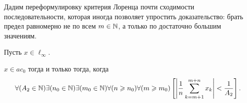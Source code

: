Дадим переформулировку критерия Лоренца
\cite{lorentz1948contribution,bennett1974consistency}
почти сходимости последовательности,
которая иногда позволяет упростить доказательство:
брать предел равномерно не по всем $m\in \mathbb{N}$,
а только по достаточно большим значениям.


\begin{lemma}
	\label{thm:Lorentz_mod}
	Пусть $x\in\ell_\infty$.

	$x\in ac_0$ тогда и только тогда, когда
	\begin{equation}\label{crit_pos_ac0}
		\forall(A_2\in\mathbb{N})
		\exists(n_0\in\mathbb{N})
		\exists(m_0\in\mathbb{N})
		\forall(n\geqslant n_0)
		\forall(m\geqslant m_0)
		\\
		\left[
			\left|
			\frac{1}{n}
			\sum_{k=m+1}^{m+n} x_k
			\right|
			<
			\frac{1}{A_2}
		\right]
		.
	\end{equation}

\end{lemma}

